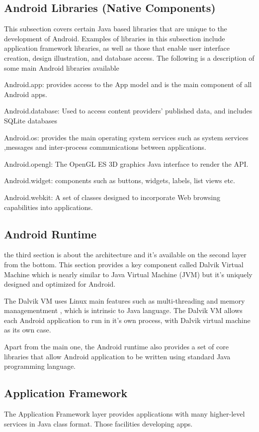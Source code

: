 \documentclass[preprint,12pt]{elsarticle}
\begin{document}
\subsection{Android Libraries (Native Components)}

This subsection covers certain Java based libraries that are unique to the development of Android. Examples of libraries in this subsection include application framework libraries, as well as those that enable user interface creation, design illustration, and database access. The following is a description of some main Android libraries available 

Android.app: provides access to the App model and is the main component of all Android apps. 

Android.database: Used to access content providers' published data, and includes SQLite databases

Android.os: provides the main operating system services such as system services ,messages and inter-process communications between applications. 

Android.opengl: The OpenGL ES 3D graphics Java interface to render the API.

Android.widget: components such as buttons, widgets, labels, list views etc.

Android.webkit: A set of classes designed to incorporate Web browsing capabilities into applications.


\subsection{Android Runtime} 
the third section is about the architecture and it's available on the second layer from the bottom. This section provides a key component called Dalvik Virtual Machine which is nearly similar to Java Virtual Machine (JVM) but it's uniquely designed and optimized for Android.

The Dalvik VM uses Linux main features such as multi-threading and memory managementment , which is intrinsic to Java language.
The Dalvik VM allows each Android application to run in it's own process, with Dalvik virtual machine as its own case.

Apart from the main one, the Android runtime also provides a set of core libraries that allow Android application to be written using standard Java programming language.

\subsection{Application Framework}
The Application Framework layer provides applications with many higher-level services in Java class format. Those facilities developing apps.
\end{document}
